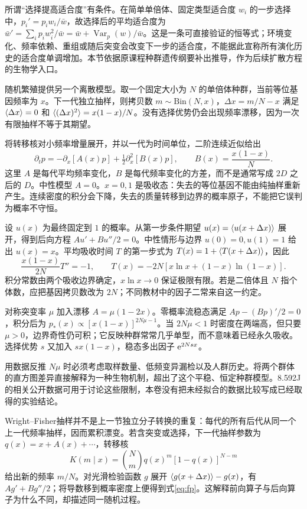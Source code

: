所谓“选择提高适合度”有条件。在简单单倍体、固定类型适合度 $w_i$ 的一步选择中，$p_i'=p_iw_i/\bar w$，故选择后的平均适合度为 $\bar w'=\sum_i p_iw_i^2/\bar w=\bar w+\operatorname{Var}_p(w)/\bar w$。这是一条可直接验证的恒等式；环境变化、频率依赖、重组或随后突变会改变下一步的适合度，不能据此宣称所有演化历史的适合度单调增加。本节依据原课程种群遗传纲要补出推导，作为后续扩散方程的生物学入口。

随机繁殖提供另一个离散模型。取一个固定大小为 $N$ 的单倍体种群，当前等位基因频率为 $x$。下一代独立抽样，则拷贝数 $m\sim\mathrm{Bin}(N,x)$，$\Delta x=m/N-x$ 满足 $\langle \Delta x\rangle=0$ 和 $\langle (\Delta x)^2\rangle=x(1-x)/N$。没有选择优势仍会出现频率漂移，因为一次有限抽样不等于其期望。

将转移核对小频率增量展开，并以一代为时间单位，二阶连续近似给出
\begin{equation}\label{eq:fp}
\partial_t p=-\partial_x[A(x)p]+\tfrac12\partial_x^2[B(x)p],\qquad B(x)=\frac{x(1-x)}N.
\end{equation}
这里 $A$ 是每代平均频率变化，$B$ 是每代频率变化的方差，而不是通常写成 $2D$ 之后的 $D$。中性模型 $A=0$。$x=0,1$ 是吸收态：失去的等位基因不能由纯抽样重新产生。连续密度的积分会下降，失去的质量转移到边界的概率原子，不能把它误判为概率不守恒。

设 $u(x)$ 为最终固定到 $1$ 的概率。从第一步条件期望 $u(x)=\langle u(x+\Delta x)\rangle$ 展开，得到后向方程 $Au'+Bu''/2=0$。中性情形与边界 $u(0)=0,u(1)=1$ 给出 $u(x)=x$。平均吸收时间 $T$ 的第一步式为 $T(x)=1+\langle T(x+\Delta x)\rangle$，因此
\[
\frac{x(1-x)}{2N}T''=-1,\qquad
T(x)=-2N[x\ln x+(1-x)\ln(1-x)].
\]
积分常数由两个吸收边界确定，$x\ln x\to0$ 保证极限有限。若是二倍体且 $N$ 指个体数，应把基因拷贝数改为 $2N$；不同教材中的因子二常来自这一约定。

对称突变率 $\mu$ 加入漂移 $A=\mu(1-2x)$。零概率流稳态满足 $Ap-(Bp)'/2=0$，积分后为 $p_*(x)\propto[x(1-x)]^{2N\mu-1}$。当 $2N\mu<1$ 时密度在两端高，但只要 $\mu>0$，边界奇性仍可积；它反映种群常常几乎单型，而不意味着已经永久吸收。选择优势 $s$ 又加入 $s x(1-x)$，稳态多出因子 $\mathrm e^{2Nsx}$。

用数据反推 $N\mu$ 时必须考虑取样数量、低频变异漏检以及人群历史。将两个群体的直方图差异直接解释为一种生物机制，超出了这个平稳、恒定种群模型。8.592J 的相关公开数据可用于讨论这些限制，本卷没有把未经拟合的数据比较写成已经取得的实验结论。

Wright--Fisher抽样并不是上一节独立分子转换的重复：每代的所有后代从同一个上一代频率抽样，因而累积漂变。若含突变或选择，下一代抽样参数为 $q(x)=x+A(x)+\cdots$，转移核
\[
K(m\mid x)=\binom Nm q(x)^m[1-q(x)]^{N-m}
\]
给出新的频率 $m/N$。对光滑检验函数 $g$ 展开 $\langle g(x+\Delta x)\rangle-g(x)$，有 $Ag'+Bg''/2$；将导数移到概率密度上便得到式\eqref{eq:fp}。这解释前向算子与后向算子为什么不同，却描述同一随机过程。

